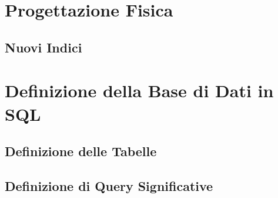 \documentclass{article}
\begin{document}
% 
% 
% 
% 
% 
% 




\clearpage
\section{Progettazione Fisica}
\subsection{Nuovi Indici}



\clearpage
\section{Definizione della Base di Dati in SQL}
\subsection{Definizione delle Tabelle}
\subsection{Definizione di Query Significative}
\end{document}
